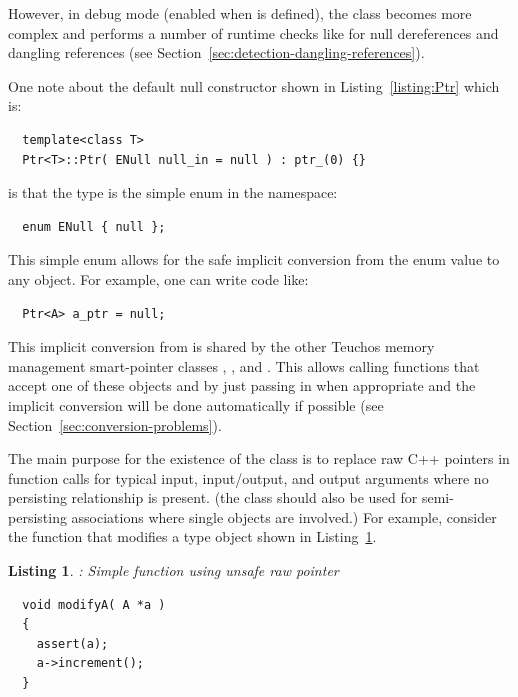 \documentclass[pdf,ps2pdf,11pt]{SANDreport}
\newtheorem{listing}{Listing}
\begin{document}
However, in debug mode (enabled when {} is
defined), the {} class becomes more complex and performs a
number of runtime checks like for null dereferences and dangling
references (see Section~\ref{sec:detection-dangling-references}).

One note about the default null constructor shown in
Listing~\ref{listing:Ptr} which is:

{\small\begin{verbatim}
  template<class T>
  Ptr<T>::Ptr( ENull null_in = null ) : ptr_(0) {}
\end{verbatim}}

{}\noindent{}is that the type {} is the simple enum in
the {} namespace:

{\small\begin{verbatim}
  enum ENull { null };
\end{verbatim}}

This simple enum allows for the safe implicit conversion from the enum
value {} to any {} object.  For example, one can
write code like:

{\small\begin{verbatim}
  Ptr<A> a_ptr = null;
\end{verbatim}}

This implicit conversion from {} is shared by the other
Teuchos memory management smart-pointer classes {},
{}, and {}.  This allows calling
functions that accept one of these objects and by just passing in
{} when appropriate and the implicit conversion will be done
automatically if possible (see Section~\ref{sec:conversion-problems}).

The main purpose for the existence of the {} class is to
replace raw C++ pointers in function calls for typical input,
input/output, and output arguments where no persisting relationship is
present.  (the class {} should also be used for
semi-persisting associations where single objects are involved.)  For
example, consider the function that modifies a type {}
object shown in Listing~\ref{listing:modifyA-rawPtr}.

{}\begin{listing}: Simple function using unsafe raw pointer
\label{listing:modifyA-rawPtr}
{\small\begin{verbatim}
  void modifyA( A *a )
  {
    assert(a);
    a->increment();
  }
\end{verbatim}}
\end{listing}
\end{document}
